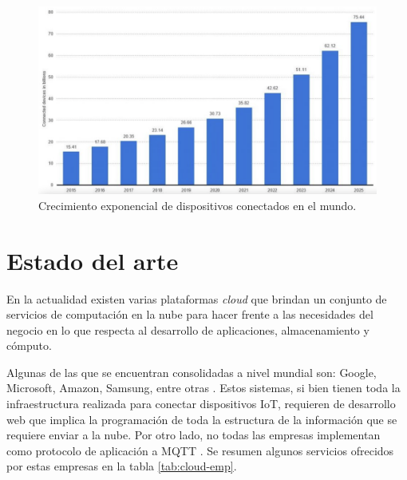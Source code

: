 \begin{figure}[htpb]
	\centering
	\includegraphics[scale=.3]{./Figures/iot-crecimiento.png}
	\caption[Crecimiento de dispositivos IoT]{Crecimiento exponencial de dispositivos conectados en el mundo\protect\footnotemark.}
	\label{fig:iot-crecimiento}
\end{figure}




\section{Estado del arte}
\label{sec:estado-arte}
En la actualidad existen varias plataformas \textit{cloud} que brindan un conjunto de servicios de computación en la nube para hacer frente a las necesidades del negocio en lo que respecta al desarrollo de aplicaciones, almacenamiento y cómputo. 

Algunas de las que se encuentran consolidadas a nivel mundial son: Google, Microsoft, Amazon, Samsung, entre otras \citep{WEBSITE:6}.  Estos sistemas, si bien tienen toda la infraestructura realizada para conectar dispositivos IoT, requieren de desarrollo web que implica la programación de toda la estructura de la información que se requiere enviar a la nube.  Por otro lado,  no todas las empresas implementan como protocolo de aplicación a MQTT \citep{WEBSITE:7}.  Se resumen algunos servicios ofrecidos por estas empresas en la tabla \ref{tab:cloud-emp}.

